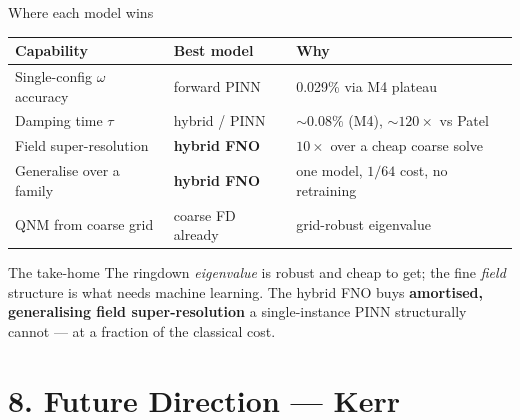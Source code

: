 \documentclass[aspectratio=169, 11pt]{beamer}
\begin{document}
\begin{frame}{Where each model wins}
  \begin{center}\small
    \begin{tabular}{@{}lll@{}}
      \toprule
      \textbf{Capability} & \textbf{Best model} & \textbf{Why} \\
      \midrule
      Single-config $\omega$ accuracy & forward PINN & 0.029\% via M4 plateau \\
      Damping time $\tau$ & hybrid / PINN & $\sim\!0.08\%$ (M4), $\sim\!120\times$ vs Patel \\
      Field super-resolution & \textbf{hybrid FNO} & $10\times$ over a cheap coarse solve \\
      Generalise over a family & \textbf{hybrid FNO} & one model, $1/64$ cost, no retraining \\
      QNM from coarse grid & coarse FD already & grid-robust eigenvalue \\
      \bottomrule
    \end{tabular}
  \end{center}
  \medskip
  \begin{block}{\footnotesize The take-home}
    \footnotesize
    The ringdown \emph{eigenvalue} is robust and cheap to get; the fine
    \emph{field} structure is what needs machine learning. The hybrid FNO buys
    \textbf{amortised, generalising field super-resolution} a single-instance PINN
    structurally cannot --- at a fraction of the classical cost.
  \end{block}
\end{frame}


\section{8. Future Direction --- Kerr}
\end{document}
